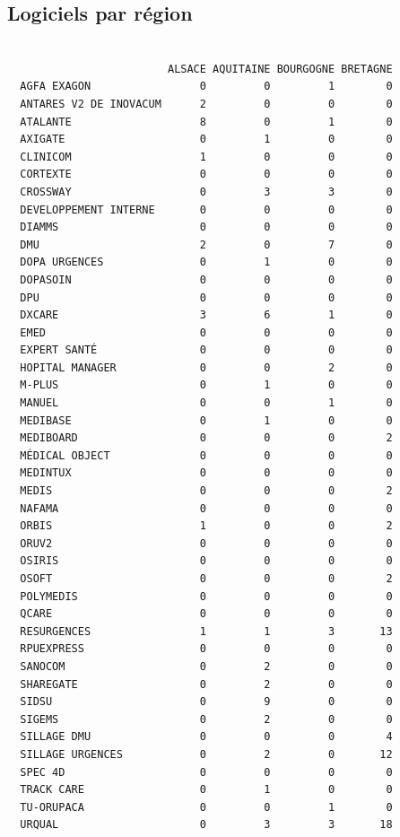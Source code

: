 \documentclass[]{article}
\begin{document}
\subsection{Logiciels par région}\label{logiciels-par-region}

\begin{verbatim}
                        
                         ALSACE AQUITAINE BOURGOGNE BRETAGNE
  AGFA EXAGON                 0         0         1        0
  ANTARES V2 DE INOVACUM      2         0         0        0
  ATALANTE                    8         0         1        0
  AXIGATE                     0         1         0        0
  CLINICOM                    1         0         0        0
  CORTEXTE                    0         0         0        0
  CROSSWAY                    0         3         3        0
  DEVELOPPEMENT INTERNE       0         0         0        0
  DIAMMS                      0         0         0        0
  DMU                         2         0         7        0
  DOPA URGENCES               0         1         0        0
  DOPASOIN                    0         0         0        0
  DPU                         0         0         0        0
  DXCARE                      3         6         1        0
  EMED                        0         0         0        0
  EXPERT SANTÉ                0         0         0        0
  HOPITAL MANAGER             0         0         2        0
  M-PLUS                      0         1         0        0
  MANUEL                      0         0         1        0
  MEDIBASE                    0         1         0        0
  MEDIBOARD                   0         0         0        2
  MÉDICAL OBJECT              0         0         0        0
  MEDINTUX                    0         0         0        0
  MEDIS                       0         0         0        2
  NAFAMA                      0         0         0        0
  ORBIS                       1         0         0        2
  ORUV2                       0         0         0        0
  OSIRIS                      0         0         0        0
  OSOFT                       0         0         0        2
  POLYMEDIS                   0         0         0        0
  QCARE                       0         0         0        0
  RESURGENCES                 1         1         3       13
  RPUEXPRESS                  0         0         0        0
  SANOCOM                     0         2         0        0
  SHAREGATE                   0         2         0        0
  SIDSU                       0         9         0        0
  SIGEMS                      0         2         0        0
  SILLAGE DMU                 0         0         0        4
  SILLAGE URGENCES            0         2         0       12
  SPEC 4D                     0         0         0        0
  TRACK CARE                  0         1         0        0
  TU-ORUPACA                  0         0         1        0
  URQUAL                      0         3         3       18
                        

\end{verbatim}
\end{document}
